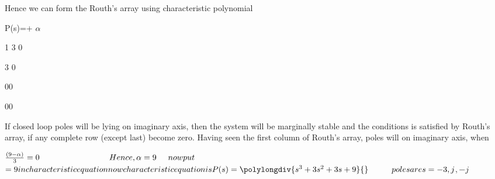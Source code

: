 \documentclass{beamer}
\begin{document}
\begin{frame}

 Hence we can form the Routh’s array using characteristic polynomial  \hfill \break 
 
 \hspace{3cm} P(s)=+ $\alpha$ \hfill \break

    

  \hspace{3cm}  \hspace{1cm} 1\hspace{1cm} 3\hspace{1cm} 0 \hfill \break
  
  \hspace{3cm}  \hspace{1cm} 3\hspace{1cm} \alpha\hspace{1cm} 0 \hfill\break
  
  \hspace{3cm}  \hspace{1cm}  \hspace{0.5cm}0\hspace{1cm}0
  
  \hspace{3cm} \hspace{1cm} \alpha\hspace{1cm} \hspace{0.5cm}0\hspace{1cm}0\hfill \break
  \end{frame}
\begin{frame}
  If closed loop poles will be lying on imaginary axis, then the system will be marginally stable and the
conditions is satisfied by Routh’s array, if any complete row (except last) become zero.
 Having seen the first column of Routh’s array, poles will on imaginary axis, when \hfill\break
 
 \hspace{3cm}     $\frac{(9-\alpha)}{3}=0 \hfill \break
  
  \hspace{3cm}   Hence, \alpha=9
  
  \hspace{0.5cm} now put $\alpha$=9 in characteristic equation 
  now characteristic equation is P(s)=\polylongdiv{s^3+3s^2+3s+9}{}\hfill\break
  
  \hspace{1cm} poles are s= -3,j$$ ,-j$
  
  
\end{frame}
\end{document}
